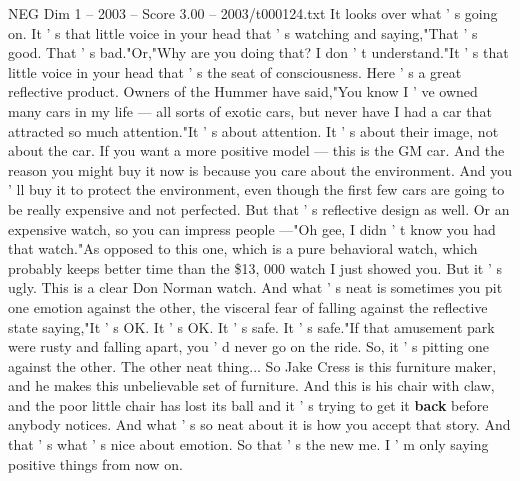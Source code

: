 \begin{textsample}{NEG Dim 1 – 2003 – Score 3.00 – 2003/t000124.txt}
It looks over what ' s going on.
It ' s that little voice in your head that ' s watching and saying,"That ' s good.
That ' s bad."Or,"Why are you doing that?
I don ' t understand."It ' s that little voice in your head that ' s the seat of consciousness.
Here ' s a great reflective product.
Owners of the Hummer have said,"You know I ' ve owned many cars in my life — all sorts of exotic cars, but never have I had a car that attracted so much attention."It ' s about attention.
It ' s about their image, not about the car.
If you want a more positive model — this is the GM car.
And the reason you might buy it now is because you care about the environment.
And you ' ll buy it to protect the environment, even though the first few cars are going to be really expensive and not perfected.
But that ' s reflective design as well.
Or an expensive watch, so you can impress people —"Oh gee, I didn ' t know you had that watch."As opposed to this one, which is a pure behavioral watch, which probably keeps better time than the \$13, 000 watch I just showed you.
But it ' s ugly.
This is a clear Don Norman watch.
And what ' s neat is sometimes you pit one emotion against the other, the visceral fear of falling against the reflective state saying,"It ' s OK.
It ' s OK.
It ' s safe.
It ' s safe."If that amusement park were rusty and falling apart, you ' d never go on the ride.
So, it ' s pitting one against the other.
The other neat thing...
So Jake Cress is this furniture maker, and he makes this unbelievable set of furniture.
And this is his chair with claw, and the poor little chair has lost its ball and it ' s trying to get it \textbf{back} before anybody notices.
And what ' s so neat about it is how you accept that story.
And that ' s what ' s nice about emotion.
So that ' s the new me.
I ' m only saying positive things from now on.

\end{textsample}
